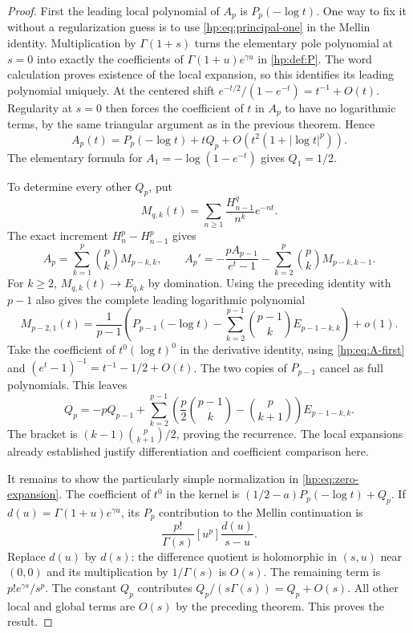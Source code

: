 \begin{proof}
First the leading local polynomial of $A_p$ is $P_p(-\log t)$.
One way to fix it without a regularization guess is to use
\eqref{hp:eq:principal-one} in the Mellin identity. Multiplication by
$\Gamma(1+s)$ turns the elementary pole polynomial at $s=0$ into
exactly the coefficients of
$\Gamma(1+u)e^{\gamma u}$ in \eqref{hp:def:P}.
The word calculation proves existence of the local expansion, so this
identifies its leading polynomial uniquely.
At the centered shift
$e^{-t/2}/(1-e^{-t})=t^{-1}+O(t)$.
Regularity at $s=0$ then forces the coefficient of $t$ in $A_p$ to
have no logarithmic terms, by the same triangular argument as in the
previous theorem. Hence
\begin{equation}\label{hp:eq:A-first}
 A_p(t)=P_p(-\log t)+tQ_p+O(t^2(1+|\log t|^p)).
\end{equation}
The elementary formula for $A_1=-\log(1-e^{-t})$ gives $Q_1=1/2$.

To determine every other $Q_p$, put
\[
 M_{q,k}(t)=\sum_{n\ge1}\frac{H_{n-1}^q}{n^k}e^{-nt}.
\]
The exact increment $H_n^p-H_{n-1}^p$ gives
\[
 A_p=\sum_{k=1}^p\binom pkM_{p-k,k},\qquad
 A_p'=-\frac{pA_{p-1}}{e^t-1}
            -\sum_{k=2}^p\binom pkM_{p-k,k-1}.
\]
For $k\ge2$, $M_{q,k}(t)\to E_{q,k}$ by domination.
Using the preceding identity with $p-1$ also gives the complete
leading logarithmic polynomial
\[
 M_{p-2,1}(t)=\frac{1}{p-1}
 \left(P_{p-1}(-\log t)-
       \sum_{k=2}^{p-1}\binom{p-1}kE_{p-1-k,k}\right)+o(1).
\]
Take the coefficient of $t^0(\log t)^0$ in the derivative identity,
using \eqref{hp:eq:A-first} and
$(e^t-1)^{-1}=t^{-1}-1/2+O(t)$.
The two copies of $P_{p-1}$ cancel as full polynomials. This leaves
\[
 Q_p=-pQ_{p-1}+\sum_{k=2}^{p-1}
 \left(\frac p2\binom{p-1}k-\binom p{k+1}\right)E_{p-1-k,k}.
\]
The bracket is $(k-1)\binom p{k+1}/2$, proving the recurrence.
The local expansions already established justify differentiation and
coefficient comparison here.

It remains to show the particularly simple normalization in
\eqref{hp:eq:zero-expansion}. The coefficient of $t^0$ in the kernel is
$(1/2-a)P_p(-\log t)+Q_p$. If
$d(u)=\Gamma(1+u)e^{\gamma u}$, its $P_p$ contribution to the Mellin
continuation is
\[
 \frac{p!}{\Gamma(s)}[u^p]\frac{d(u)}{s-u}.
\]
Replace $d(u)$ by $d(s)$: the difference quotient is holomorphic in
$(s,u)$ near $(0,0)$ and its multiplication by $1/\Gamma(s)$ is
$O(s)$. The remaining term is
$p!e^{\gamma s}/s^p$. The constant $Q_p$ contributes
$Q_p/(s\Gamma(s))=Q_p+O(s)$. All other local and global terms are
$O(s)$ by the preceding theorem. This proves the result.
\end{proof}

